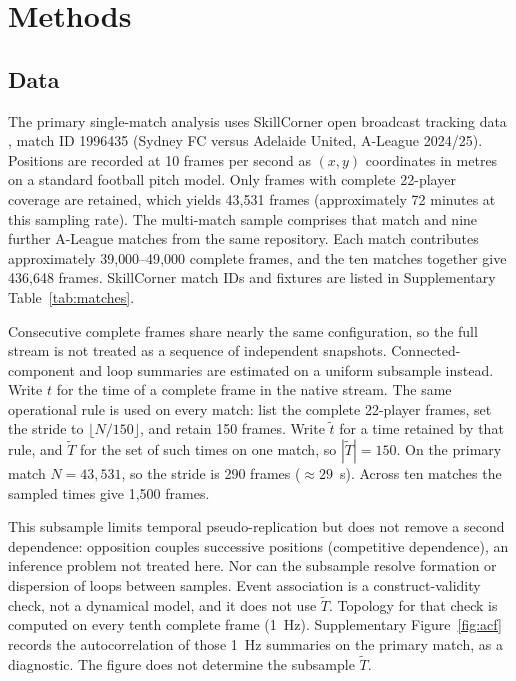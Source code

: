 \section{Methods}

\subsection{Data}
\label{sec:data}

The primary single-match analysis uses SkillCorner open broadcast
tracking data \citep{SkillCorner2024}, match ID 1996435 (Sydney FC
versus Adelaide United, A-League 2024/25). Positions are recorded at
10 frames per second as $(x, y)$ coordinates in metres on a standard
football pitch model. Only frames with complete 22-player coverage are
retained, which yields 43{,}531 frames (approximately 72 minutes at
this sampling rate). The multi-match sample comprises that match and
nine further A-League matches from the same repository. Each match
contributes approximately 39{,}000--49{,}000 complete frames, and the
ten matches together give 436{,}648 frames. SkillCorner match IDs and
fixtures are listed in Supplementary Table~\ref{tab:matches}.

Consecutive complete frames share nearly the same configuration, so
the full stream is not treated as a sequence of independent snapshots.
Connected-component and loop summaries are estimated on a uniform
subsample instead. Write $t$ for the time of a complete frame
in the native stream. The same operational rule is used on every
match: list the complete 22-player frames, set the stride to
$\lfloor N/150\rfloor$, and retain 150 frames. Write $\tilde{t}$ for a
time retained by that rule, and $\tilde{T}$ for the set of such times
on one match, so $|\tilde{T}|=150$. On the primary match
$N = 43{,}531$, so the stride is 290 frames ($\approx 29$~s). Across
ten matches the sampled times give 1{,}500 frames.

This subsample limits temporal pseudo-replication but does not remove
a second dependence: opposition couples successive positions
(competitive dependence), an inference problem not treated here. Nor
can the subsample resolve formation or dispersion of loops between
samples. Event association is a
construct-validity check, not a dynamical model, and it does not use
$\tilde{T}$. Topology for that check is computed on every tenth
complete frame (1~Hz). Supplementary Figure~\ref{fig:acf} records the
autocorrelation of those 1~Hz summaries on the primary match, as a
diagnostic. The figure does not determine the subsample
$\tilde{T}$.

